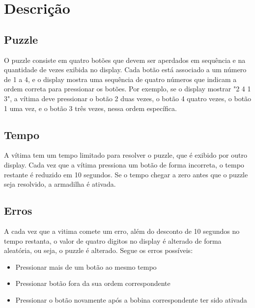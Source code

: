 \chapter{Descrição}

\section{Puzzle}
O puzzle consiste em quatro botões que devem ser aperdados em sequência e na quantidade de vezes exibida no display. Cada botão está associado a um número de 1 a 4, e o display mostra uma sequência de quatro números que indicam a ordem correta para pressionar os botões. Por exemplo, se o display mostrar "2 4 1 3", a vítima deve pressionar o botão 2 duas vezes, o botão 4 quatro vezes, o botão 1 uma vez, e o botão 3 três vezes, nessa ordem específica.

\section{Tempo}
A vítima tem um tempo limitado para resolver o puzzle, que é exibido por outro display. Cada vez que a vítima pressiona um botão de forma incorreta, o tempo restante é reduzido em 10 segundos. Se o tempo chegar a zero antes que o puzzle seja resolvido, a armadilha é ativada. 

\section{Erros}
A cada vez que a vitima comete um erro, além do desconto de 10 segundos no tempo restanta, o valor de quatro digitos no display é alterado de forma aleatória, ou seja, o puzzle é alterado. Segue os erros possíveis:

\begin{itemize}
    \item Pressionar mais de um botão ao mesmo tempo
    \item Pressionar botão fora da sua ordem correspondente
    \item Pressionar o botão novamente após a bobina correspondente ter sido ativada
\end{itemize}

